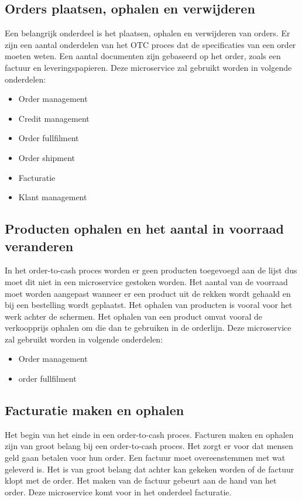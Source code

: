 \subsection{Orders plaatsen, ophalen en verwijderen}
Een belangrijk onderdeel is het plaatsen, ophalen en verwijderen van orders. Er zijn een aantal onderdelen van het OTC proces dat de specificaties van een order moeten weten. Een aantal documenten zijn gebaseerd op het order, zoals een factuur en leveringspapieren. 
Deze microservice zal gebruikt worden in volgende onderdelen:
\begin{itemize}
	\item Order management
	\item Credit management
	\item Order fullfilment
	\item Order shipment
	\item Facturatie
	\item Klant management
\end{itemize}

\subsection{Producten ophalen en het aantal in voorraad veranderen}
In het order-to-cash proces worden er geen producten toegevoegd aan de lijst dus moet dit niet in een microservice gestoken worden. Het aantal van de voorraad moet worden aangepast wanneer er een product uit de rekken wordt gehaald en bij een bestelling wordt geplaatst. Het ophalen van producten is vooral voor het werk achter de schermen. Het ophalen van een product omvat vooral de verkoopprijs ophalen om die dan te gebruiken in de orderlijn. 
Deze microservice zal gebruikt worden in volgende onderdelen:
\begin{itemize}
	\item Order management
	\item order fullfilment
\end{itemize}

\subsection{Facturatie maken en ophalen}
Het begin van het einde in een order-to-cash proces. Facturen maken en ophalen zijn van groot belang bij een order-to-cash proces. Het zorgt er voor dat mensen geld gaan betalen voor hun order. Een factuur moet overeenstemmen met wat geleverd is. Het is van groot belang dat achter kan gekeken worden of de factuur klopt met de order. Het maken van de factuur gebeurt aan de hand van het order. 
Deze microservice komt voor in het onderdeel facturatie.

